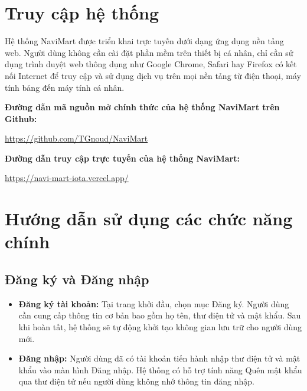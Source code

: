 \documentclass[../main.tex]{subfiles}
\begin{document}
\section{Truy cập hệ thống}
Hệ thống NaviMart được triển khai trực tuyến dưới dạng ứng dụng nền tảng web. Người dùng không cần cài đặt phần mềm trên thiết bị cá nhân, chỉ cần sử dụng trình duyệt web thông dụng như Google Chrome, Safari hay Firefox có kết nối Internet để truy cập và sử dụng dịch vụ trên mọi nền tảng từ điện thoại, máy tính bảng đến máy tính cá nhân.

\textbf{Đường dẫn mã nguồn mở chính thức của hệ thống NaviMart trên Github:}
\begin{center}
    \url{https://github.com/TGnoud/NaviMart}
\end{center}

\textbf{Đường dẫn truy cập trực tuyến của hệ thống NaviMart:}
\begin{center}
    \url{https://navi-mart-iota.vercel.app/}
\end{center}

\section{Hướng dẫn sử dụng các chức năng chính}

\subsection{Đăng ký và Đăng nhập}
\begin{itemize}
    \item \textbf{Đăng ký tài khoản:} Tại trang khởi đầu, chọn mục Đăng ký. Người dùng cần cung cấp thông tin cơ bản bao gồm họ tên, thư điện tử và mật khẩu. Sau khi hoàn tất, hệ thống sẽ tự động khởi tạo không gian lưu trữ cho người dùng mới.
    \item \textbf{Đăng nhập:} Người dùng đã có tài khoản tiến hành nhập thư điện tử và mật khẩu vào màn hình Đăng nhập. Hệ thống có hỗ trợ tính năng Quên mật khẩu qua thư điện tử nếu người dùng không nhớ thông tin đăng nhập.
\end{itemize}
\end{document}
